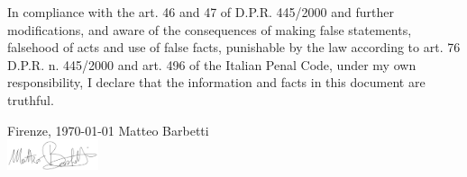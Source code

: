 \documentclass[a4, 11pt]{report}
\begin{document}


    \vskip 12mm

    {\small In compliance with the art. 46 and 47 of D.P.R. 445/2000 and further modifications, and aware of the consequences of making 
    false statements, falsehood of acts and use of false facts, punishable by the law according to art. 76 D.P.R. n. 445/2000
    and art. 496 of the Italian Penal Code, under my own responsibility, I declare that the information and facts in this document
    are truthful.}
  
    \vskip 6mm 
  
    {\small Firenze, \today}
    \hfill {\small Matteo Barbetti}\\ [3mm]
    \null \hfill \includegraphics[width=0.20\textwidth]{academic-cv/phd-applications/img/signature.png}
  
\end{document}
